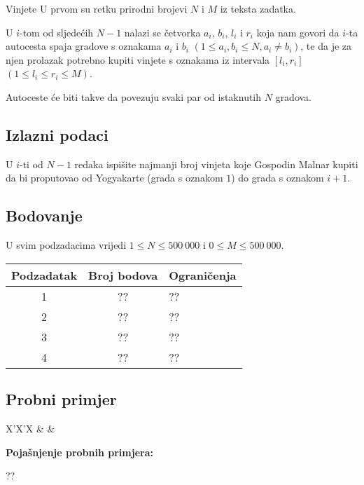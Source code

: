 \begin{statement}[
  problempoints=100,
  timelimit=1 sekunda,
  memorylimit=512 MiB,
]{Vinjete}
U prvom su retku prirodni brojevi $N$ i $M$ iz teksta zadatka.

U $i$-tom od sljedećih $N-1$ nalazi se četvorka $a_i$, $b_i$, $l_i$ i $r_i$
koja nam govori da $i$-ta autocesta spaja gradove s oznakama $a_i$ i $b_i$
$(1 \le a_i, b_i \le N, a_i \ne b_i)$, te da je za njen prolazak potrebno
kupiti vinjete s oznakama iz intervala $[l_i, r_i]$ $(1 \le l_i \le r_i \le
M)$.

Autoceste će biti takve da povezuju svaki par od istaknutih $N$ gradova.

\subsection*{Izlazni podaci}

U $i$-ti od $N - 1$ redaka ispišite najmanji broj vinjeta koje Gospodin Malnar
kupiti da bi proputovao od Yogyakarte (grada s oznakom $1$) do grada s
oznakom $i+1$.

\subsection*{Bodovanje}

U svim podzadacima vrijedi $1 \leq N \leq 500~000$ i $0 \leq M \leq 500~000$.

{\renewcommand{\arraystretch}{1.4}
  \setlength{\tabcolsep}{6pt}
  \begin{tabular}{ccl}
   Podzadatak & Broj bodova & Ograničenja \\ \midrule
    1 & ?? & ?? \\
    2 & ?? & ?? \\
    3 & ?? & ?? \\
    4 & ?? & ??
\end{tabular}}

\subsection*{Probni primjer}
\begin{tabularx}{\textwidth}{X'X'X}
 &
 &
\end{tabularx}

\textbf{Pojašnjenje probnih primjera:}

??

\end{statement}

